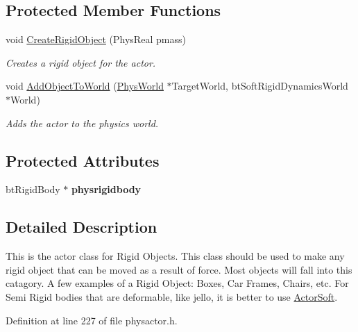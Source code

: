 \subsection*{Protected Member Functions}
\begin{DoxyCompactItemize}
\item 
void \hyperlink{classActorRigid_ac651eed187c3cb912bc7f294f0b42ad1}{CreateRigidObject} (PhysReal pmass)
\begin{DoxyCompactList}\small\item\em Creates a rigid object for the actor. \item\end{DoxyCompactList}\item 
void \hyperlink{classActorRigid_ac6d7e05944623329f0c2140c19e2c49e}{AddObjectToWorld} (\hyperlink{classPhysWorld}{PhysWorld} $\ast$TargetWorld, btSoftRigidDynamicsWorld $\ast$World)
\begin{DoxyCompactList}\small\item\em Adds the actor to the physics world. \item\end{DoxyCompactList}\end{DoxyCompactItemize}
\subsection*{Protected Attributes}
\begin{DoxyCompactItemize}
\item 
\hypertarget{classActorRigid_a6942757e081b5261dbf266f197dc56ab}{
btRigidBody $\ast$ {\bfseries physrigidbody}}
\label{d5/d10/classActorRigid_a6942757e081b5261dbf266f197dc56ab}

\end{DoxyCompactItemize}


\subsection{Detailed Description}
This is the actor class for Rigid Objects. This class should be used to make any rigid object that can be moved as a result of force. Most objects will fall into this catagory. A few examples of a Rigid Object: Boxes, Car Frames, Chairs, etc. For Semi Rigid bodies that are deformable, like jello, it is better to use \hyperlink{classActorSoft}{ActorSoft}. 

Definition at line 227 of file physactor.h.

